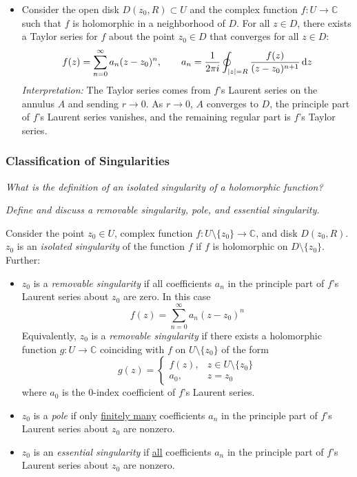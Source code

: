 \documentclass[11pt, a4paper]{article}
\newcommand{\question}[1]{\textit{#1}\vspace{2mm}}
\newcommand{\C}{\mathbb{C}} %
\newcommand{\diff}{\mathop{}\!\mathrm{d}} %
\begin{document}
\begin{itemize}
	\item Consider the open disk $ D(z_0, R) \subset U $ and the complex function $ f : U \to \C $ such that $ f $ is holomorphic in a neighborhood of $ D $. For all $ z \in D $, there exists a Taylor series for $ f $ about the point $ z_0 \in D $ that converges for all $ z \in D $:
	\begin{equation*}
		f(z) = \sum_{n = 0}^{\infty}a_n (z-z_0)^n, \qquad a_n = \frac{1}{2\pi i} \oint_{\abs{z}=R} \frac{f(z)}{(z - z_0)^{n+1}} \diff z
	\end{equation*}
	\textit{Interpretation:} The Taylor series comes from $ f $'s Laurent series on the annulus $ A $ and sending $ r \to 0 $. As $ r \to 0 $, $ A $ converges to $ D $, the principle part of $ f $'s Laurent series vanishes, and the remaining regular part is $ f $'s Taylor series.
	
	
\end{itemize}


\subsubsection{Classification of Singularities}
\question{What is the definition of an isolated singularity of a holomorphic function? }

\question{Define and discuss a removable singularity, pole, and essential singularity.}

Consider the point $ z_{0} \in U $, complex function $ f: U \setminus \{z_0\} \to \C $, and disk $ D(z_{0}, R) $. $ z_0 $ is an \textit{isolated singularity} of  the function $ f $ if $ f $ is holomorphic on $ D \setminus \{z_0\} $. Further:
\begin{itemize}
	\item $ z_{0} $ is a \textit{removable singularity} if all coefficients $ a_n $ in the principle part of $ f $'s Laurent series about $ z_0 $ are zero. In this case
	\begin{equation*}
		f(z) = \sum_{n=0}^{\infty}a_n(z - z_0)^n
	\end{equation*}
	Equivalently, $ z_0 $ is a \textit{removable singularity} if there exists a holomorphic function $ g : U \to \C  $ coinciding with $ f $ on $ U \setminus \{z_0\} $ of the form
	\[
		g(z) = \begin{cases}
			f(z), &  z \in U \setminus \{z_0\}\\
			a_0, & z = z_0
		\end{cases}
	\]
	where $ a_0 $ is the $ 0 $-index coefficient of $ f $'s Laurent series.
	
	\item $ z_{0} $ is a \textit{pole} if only \underline{finitely many} coefficients $ a_n $ in the principle part of $ f $'s Laurent series about $ z_0 $ are nonzero.
	
	\item $ z_{0} $ is an \textit{essential singularity} if \underline{all} coefficients $ a_n $ in the principle part of $ f $'s Laurent series about $ z_0 $ are nonzero.
\end{itemize}
\end{document}
